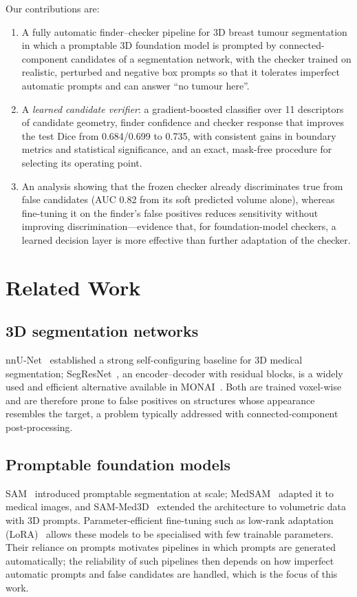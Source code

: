 \documentclass[journal]{IEEEtran}
\begin{document}
Our contributions are:
\begin{enumerate}
\item A fully automatic finder--checker pipeline for 3D breast tumour segmentation in which a promptable 3D foundation model is prompted by connected-component candidates of a segmentation network, with the checker trained on realistic, perturbed and negative box prompts so that it tolerates imperfect automatic prompts and can answer ``no tumour here''.
\item A \emph{learned candidate verifier}: a gradient-boosted classifier over 11 descriptors of candidate geometry, finder confidence and checker response that improves the test Dice from 0.684/0.699 to 0.735, with consistent gains in boundary metrics and statistical significance, and an exact, mask-free procedure for selecting its operating point.
\item An analysis showing that the frozen checker already discriminates true from false candidates (AUC 0.82 from its soft predicted volume alone), whereas fine-tuning it on the finder's false positives reduces sensitivity without improving discrimination---evidence that, for foundation-model checkers, a learned decision layer is more effective than further adaptation of the checker.
\end{enumerate}

\section{Related Work}
\subsection{3D segmentation networks}
nnU-Net~\cite{isensee2021nnunet} established a strong self-configuring baseline for 3D medical segmentation; SegResNet~\cite{myronenko2019segresnet}, an encoder--decoder with residual blocks, is a widely used and efficient alternative available in MONAI~\cite{cardoso2022monai}. Both are trained voxel-wise and are therefore prone to false positives on structures whose appearance resembles the target, a problem typically addressed with connected-component post-processing.

\subsection{Promptable foundation models}
SAM~\cite{kirillov2023sam} introduced promptable segmentation at scale; MedSAM~\cite{ma2024medsam} adapted it to medical images, and SAM-Med3D~\cite{wang2023sammed3d} extended the architecture to volumetric data with 3D prompts. Parameter-efficient fine-tuning such as low-rank adaptation (LoRA)~\cite{hu2022lora} allows these models to be specialised with few trainable parameters. Their reliance on prompts motivates pipelines in which prompts are generated automatically; the reliability of such pipelines then depends on how imperfect automatic prompts and false candidates are handled, which is the focus of this work.
\end{document}
